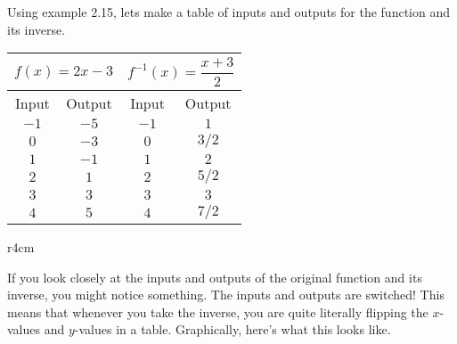 \documentclass[lang=en,11pt]{elegantbook}
\begin{document}
Using example 2.15, lets make a table of inputs and outputs for the function and its inverse.
\begin{table}[!htbp]
\centering
\begin{tabular}{|c|c|c|c|}
\hline
\multicolumn{2}{c}{$f(x)=2x-3$} & \multicolumn{2}{c}{$f^{-1}(x)=\dfrac{x+3}{2}$}\\
\hline
Input   & Output   & Input    & Output   \\
$-1$ & $-5$ & $-1$ & $1$  \\
$0$  & $-3$ & $0$  & $3/2$  \\
$1$  & $-1$ & $1$  & $2$  \\
$2$  & $1$  & $2$  & $5/2$ \\
$3$  & $3$  & $3$  & $3$ \\
$4$  & $5$  & $4$  & $7/2$ \\
\hline
\end{tabular}
\end{table}
\begin{wrapfigure}{r}{4cm}
\end{wrapfigure}
If you look closely at the inputs and outputs of the original function and its inverse, you might notice something.  The inputs and outputs are switched!  This means that whenever you take the inverse, you are quite literally flipping the $x$-values and $y$-values in a table.  Graphically, here's what this looks like.
\end{document}

